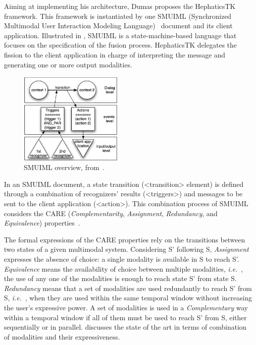 Aiming at implementing his architecture, Dumas proposes the HephaticsTK
framework. This framework is instantiated by one SMUIML (Synchronized
Multimodal User Interaction Modeling Language)~\cite{dumas_description_2010} document and its client
application. Illustrated in , SMUIML is a state-machine-based
language
that focuses on the specification of the fusion process. HephaticsTK delegates
the fission to the client application in charge of interpreting the message and
generating one or more output modalities.

\begin{figure}[!ht]
\begin{center}
	\includegraphics[width=5cm, keepaspectratio]{img/img8.png}
	\caption[SMUIML overview]{SMUIML overview, from~\cite{dumas_prototyping_2008}.}
	\label{fig:smuiml}
    \captionvspace
\end{center}
\end{figure}

In an SMUIML document, a state transition (<transition> element) is defined
through a combination of recognizers’ results (<triggers>) and messages to be
sent to the client application (<action>). This combination process of SMUIML
considers the CARE (\textit{Complementarity}, \textit{Assignment},
\textit{Redundancy}, and \textit{Equivalence}) properties~\cite{coutaz_four_1995}.

The formal expressions of the CARE properties rely on the transitions between
two states of a given multimodal system. Considering S’ following S,
\textit{Assignment} expresses the absence of choice: a single modality is
available in S to reach S’. \textit{Equivalence} means the availability of
choice between multiple modalities, \textit{i.e.}~, the use of any one of the modalities is
enough to reach state S’ from state S. \textit{Redundancy} means that a set of
modalities are used redundantly to reach S’ from S, \textit{i.e.}~, when they are used
within the same temporal window without increasing the user’s expressive power.
A set of modalities is used in a \textit{Complementary} way within a temporal
window if all of them must be used to reach S’ from S, either sequentially or in
parallel.  discusses the state of the art in
terms of combination of modalities and their expressiveness.

